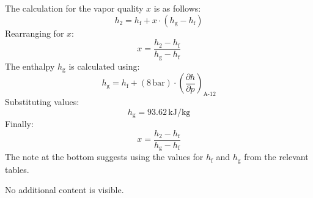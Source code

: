 The calculation for the vapor quality \( x \) is as follows:  
\[
h_2 = h_{\text{f}} + x \cdot (h_{\text{g}} - h_{\text{f}})
\]  
Rearranging for \( x \):  
\[
x = \frac{h_2 - h_{\text{f}}}{h_{\text{g}} - h_{\text{f}}}
\]  
The enthalpy \( h_{\text{g}} \) is calculated using:  
\[
h_{\text{g}} = h_{\text{f}} + (8 \, \text{bar}) \cdot \left( \frac{\partial h}{\partial p} \right)_{\text{A-12}}
\]  
Substituting values:  
\[
h_{\text{g}} = 93.62 \, \text{kJ/kg}
\]  
Finally:  
\[
x = \frac{h_2 - h_{\text{f}}}{h_{\text{g}} - h_{\text{f}}}
\]  
The note at the bottom suggests using the values for \( h_{\text{f}} \) and \( h_{\text{g}} \) from the relevant tables.  

No additional content is visible.